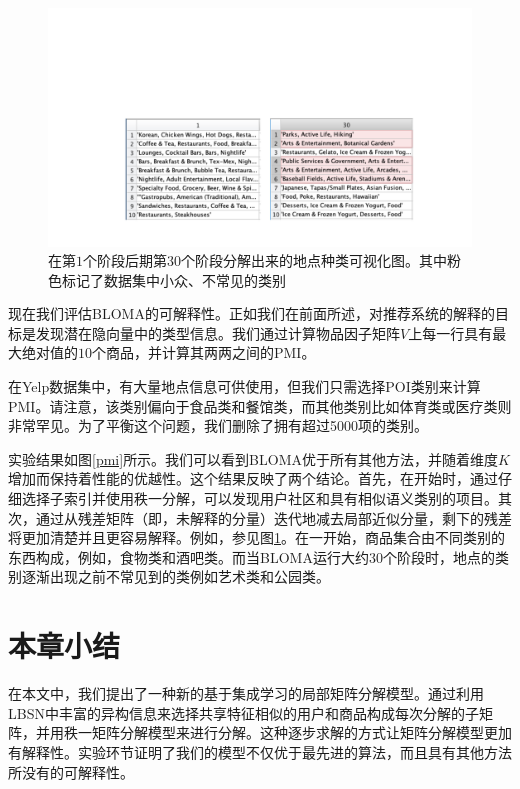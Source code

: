 \begin{figure}[!t]
\centering
\includegraphics[width=\textwidth]{pics/factors.pdf}
\caption{在第$1$个阶段后期第$30$个阶段分解出来的地点种类可视化图。其中粉色标记了数据集中小众、不常见的类别} 
\label{factors}
\end{figure}

现在我们评估BLOMA的可解释性。正如我们在前面所述，对推荐系统的解释的目标是发现潜在隐向量中的类型信息。我们通过计算物品因子矩阵$V$上每一行具有最大绝对值的$10$个商品，并计算其两两之间的PMI。

在Yelp数据集中，有大量地点信息可供使用，但我们只需选择POI类别来计算PMI。请注意，该类别偏向于食品类和餐馆类，而其他类别比如体育类或医疗类则非常罕见。为了平衡这个问题，我们删除了拥有超过5000项的类别。

实验结果如图\ref{pmi}所示。我们可以看到BLOMA优于所有其他方法，并随着维度$ K $增加而保持着性能的优越性。这个结果反映了两个结论。首先，在开始时，通过仔细选择子索引并使用秩一分解，可以发现用户社区和具有相似语义类别的项目。其次，通过从残差矩阵（即，未解释的分量）迭代地减去局部近似分量，剩下的残差将更加清楚并且更容易解释。例如，参见图\ref{factors}。在一开始，商品集合由不同类别的东西构成，例如，食物类和酒吧类。而当BLOMA运行大约30个阶段时，地点的类别逐渐出现之前不常见到的类例如艺术类和公园类。





\section{本章小结}
\label{conclusion}
在本文中，我们提出了一种新的基于集成学习的局部矩阵分解模型。通过利用LBSN中丰富的异构信息来选择共享特征相似的用户和商品构成每次分解的子矩阵，并用秩一矩阵分解模型来进行分解。这种逐步求解的方式让矩阵分解模型更加有解释性。实验环节证明了我们的模型不仅优于最先进的算法，而且具有其他方法所没有的可解释性。
\newpage\mbox{}\thispagestyle{empty}\newpage


